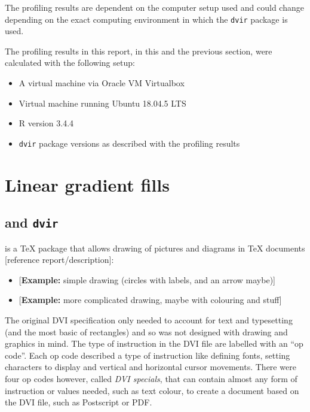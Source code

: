 \documentclass[]{article}
\providecommand{\tightlist}{%
  \setlength{\itemsep}{0pt}\setlength{\parskip}{0pt}}
\begin{document}
The profiling results are dependent on the computer setup used and could
change depending on the exact computing environment in which the
\texttt{dvir} package is used.

The profiling results in this report, in this and the previous section,
were calculated with the following setup:

\begin{itemize}
\tightlist
\item
  A virtual machine via Oracle VM Virtualbox
\item
  Virtual machine running Ubuntu 18.04.5 LTS
\item
  R version 3.4.4
\item
  \texttt{dvir} package versions as described with the profiling results
\end{itemize}

\newpage{}

\section{Linear gradient fills}\label{linear-gradient-fills}

\subsection{\texorpdfstring{\Tikz{} and
\texttt{dvir}}{ and dvir}}\label{and-dvir}

\Tikz{} is a \TeX{} package that allows drawing of pictures and diagrams
in \TeX{} documents {[}reference \Tikz{} report/description{]}:

\begin{itemize}
\item
  {[}\textbf{Example:} simple \Tikz{} drawing (circles with labels, and
  an arrow maybe){]}
\item
  {[}\textbf{Example:} more complicated \Tikz{} drawing, maybe with
  colouring and stuff{]}
\end{itemize}

The original DVI specification only needed to account for text and
typesetting (and the most basic of rectangles) and so was not designed
with drawing and graphics in mind. The type of instruction in the DVI
file are labelled with an ``op code''. Each op code described a type of
instruction like defining fonts, setting characters to display and
vertical and horizontal cursor movements. There were four op codes
however, called \emph{DVI specials}, that can contain almost any form of
instruction or values needed, such as text colour, to create a document
based on the DVI file, such as Postscript or PDF.
\end{document}

